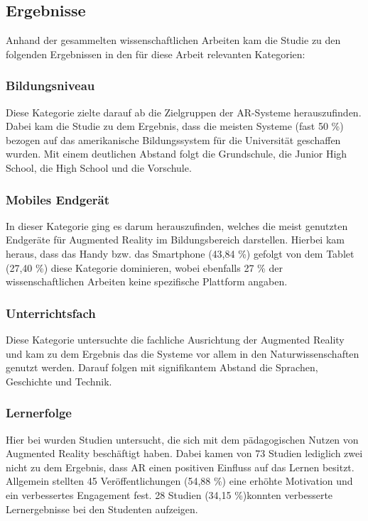 \subsection{Ergebnisse}
Anhand der gesammelten wissenschaftlichen Arbeiten kam die Studie zu den folgenden Ergebnissen in den für diese Arbeit relevanten Kategorien:

\subsubsection{Bildungsniveau}
Diese Kategorie zielte darauf ab die Zielgruppen der AR-Systeme herauszufinden. Dabei kam die Studie zu dem Ergebnis, dass die meisten Systeme (fast 50 \%) bezogen auf das amerikanische Bildungssystem für die Universität geschaffen wurden. Mit einem deutlichen Abstand folgt die Grundschule, die Junior High School, die High School und die Vorschule.

\subsubsection{Mobiles Endgerät}
In dieser Kategorie ging es darum herauszufinden, welches die meist genutzten Endgeräte für Augmented Reality im Bildungsbereich darstellen. Hierbei kam heraus, dass das Handy bzw. das Smartphone (43,84 \%) gefolgt von dem Tablet (27,40 \%) diese Kategorie dominieren, wobei ebenfalls 27 \% der wissenschaftlichen Arbeiten keine spezifische Plattform angaben.

\subsubsection{Unterrichtsfach}
Diese Kategorie untersuchte die fachliche Ausrichtung der Augmented Reality und kam zu dem Ergebnis das die Systeme vor allem in den Naturwissenschaften genutzt werden. Darauf folgen mit signifikantem Abstand die Sprachen, Geschichte und Technik.

\subsubsection{Lernerfolge}
Hier bei wurden Studien untersucht, die sich mit dem pädagogischen Nutzen von Augmented Reality beschäftigt haben. Dabei kamen von 73 Studien lediglich zwei nicht zu dem Ergebnis, dass AR einen positiven Einfluss auf das Lernen besitzt.\\
Allgemein stellten 45 Veröffentlichungen (54,88 \%) eine erhöhte Motivation und ein verbessertes Engagement fest. 28 Studien (34,15 \%)konnten verbesserte Lernergebnisse bei den Studenten aufzeigen.  

